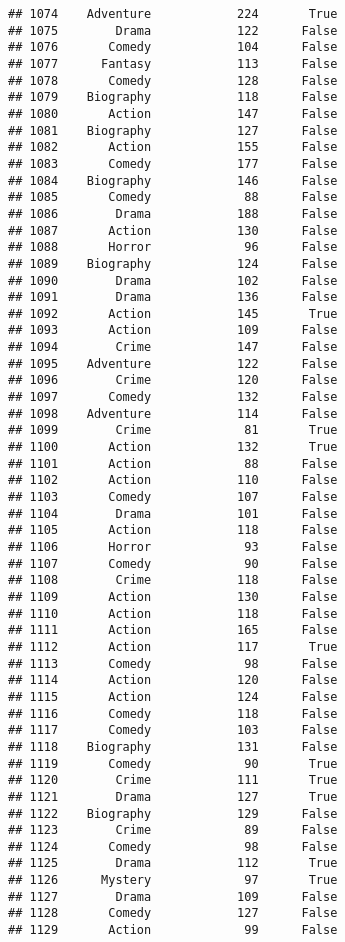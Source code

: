 \documentclass[
]{article}
\begin{document}
\begin{verbatim}
## 1074    Adventure            224       True
## 1075        Drama            122      False
## 1076       Comedy            104      False
## 1077      Fantasy            113      False
## 1078       Comedy            128      False
## 1079    Biography            118      False
## 1080       Action            147      False
## 1081    Biography            127      False
## 1082       Action            155      False
## 1083       Comedy            177      False
## 1084    Biography            146      False
## 1085       Comedy             88      False
## 1086        Drama            188      False
## 1087       Action            130      False
## 1088       Horror             96      False
## 1089    Biography            124      False
## 1090        Drama            102      False
## 1091        Drama            136      False
## 1092       Action            145       True
## 1093       Action            109      False
## 1094        Crime            147      False
## 1095    Adventure            122      False
## 1096        Crime            120      False
## 1097       Comedy            132      False
## 1098    Adventure            114      False
## 1099        Crime             81       True
## 1100       Action            132       True
## 1101       Action             88      False
## 1102       Action            110      False
## 1103       Comedy            107      False
## 1104        Drama            101      False
## 1105       Action            118      False
## 1106       Horror             93      False
## 1107       Comedy             90      False
## 1108        Crime            118      False
## 1109       Action            130      False
## 1110       Action            118      False
## 1111       Action            165      False
## 1112       Action            117       True
## 1113       Comedy             98      False
## 1114       Action            120      False
## 1115       Action            124      False
## 1116       Comedy            118      False
## 1117       Comedy            103      False
## 1118    Biography            131      False
## 1119       Comedy             90       True
## 1120        Crime            111       True
## 1121        Drama            127       True
## 1122    Biography            129      False
## 1123        Crime             89      False
## 1124       Comedy             98      False
## 1125        Drama            112       True
## 1126      Mystery             97       True
## 1127        Drama            109      False
## 1128       Comedy            127      False
## 1129       Action             99      False

\end{verbatim}
\end{document}

